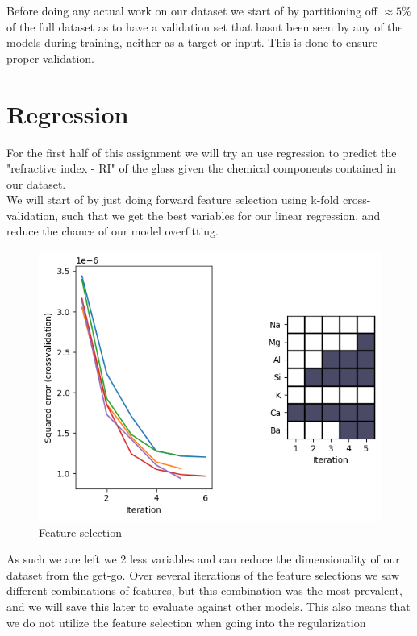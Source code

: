 Before doing any actual work on our dataset we start of by partitioning off $\approx 5\%$ of the full dataset as to have a validation set that hasnt been seen by any of the models during training, neither as a target or input. This is done to ensure proper validation. \color[red]{den her ide er scrapped for nu}

\section{Regression}
For the first half of this assignment we will try an use regression to predict the "refractive index - RI" of the glass given the chemical components contained in our dataset.\\
We will start of by just doing forward feature selection using k-fold cross-validation, such that we get the best variables for our linear regression, and reduce the chance of our model overfitting.\\
\begin{figure}[H]
    \centering
    \includegraphics[width=12cm]{images/featureselection.png}
    \caption{Feature selection}
    \label{fig:fig_select}
\end{figure}
As such we are left we 2 less variables and can reduce the dimensionality of our dataset from the get-go. Over several iterations of the feature selections we saw different combinations of features, but this combination was the most prevalent, and we will save this later to evaluate against other models. This also means that we do not utilize the feature selection when going into the regularization \\ \color[red]{Er meget usikker på det her, men giver fucking 0 mening at bruge feature selectionen ind i regularization og har kun gjort det fordi rapporten ligger op til det}

